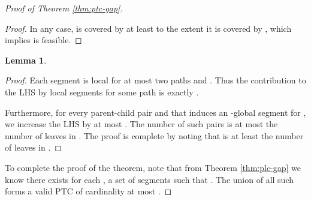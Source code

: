 \documentclass[11pt]{article}
\newtheorem{lemma}{Lemma}
\newcommand{\1}{\mathbb{1}}
\begin{document}
{\begin{proof}[Proof of Theorem \ref{thm:ptc-gap}]
\begin{proof}
  In any case,  is covered by  at least to the extent it
  is covered by , which implies  is feasible.
\end{proof}

\begin{lemma}
  
\end{lemma}

\begin{proof}
  Each segment  is local for at most two paths  and
  . Thus the contribution to the LHS by local segments for some
  path  is exactly .

  Furthermore, for every parent-child pair  and  that
  induces an -global segment for , we increase the LHS by at
  most . The number of such pairs is at most the number of leaves
  in . 
   The proof is complete by noting that  is at least the number of leaves in .
\end{proof}

To complete the proof of the theorem, note that from Theorem
\ref{thm:plc-gap} we know there exists for each , a set of segments
 such that . The union of
all such  forms a valid PTC of cardinality at most .
\end{proof}
}
\end{document}
